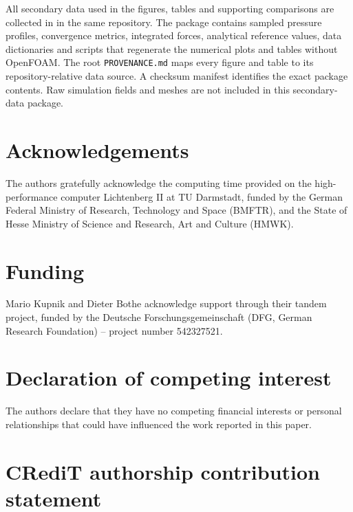 \documentclass[final,12pt,nopreprintline,longtitle]{elsarticle}
\begin{document}
All secondary data used in the figures, tables and supporting comparisons
are collected in  in the same
repository.  The package contains sampled pressure profiles, convergence
metrics, integrated forces, analytical reference values, data dictionaries
and scripts that regenerate the numerical plots and tables without
OpenFOAM.  The root \texttt{PROVENANCE.md} maps every figure and table to
its repository-relative data source.  A checksum manifest identifies the
exact package contents.  Raw simulation fields and meshes are not included
in this secondary-data package.

\section*{Acknowledgements}

The authors gratefully acknowledge the computing time provided on the
high-performance computer Lichtenberg II at TU Darmstadt, funded by the
German Federal Ministry of Research, Technology and Space (BMFTR), and the
State of Hesse Ministry of Science and Research, Art and Culture (HMWK).

\section*{Funding}

Mario Kupnik and Dieter Bothe acknowledge support through their tandem
project, funded by the Deutsche Forschungsgemeinschaft (DFG, German Research
Foundation) -- project number 542327521.

\section*{Declaration of competing interest}

The authors declare that they have no competing financial interests or
personal relationships that could have influenced the work reported in this
paper.

\section*{CRediT authorship contribution statement}
\end{document}

